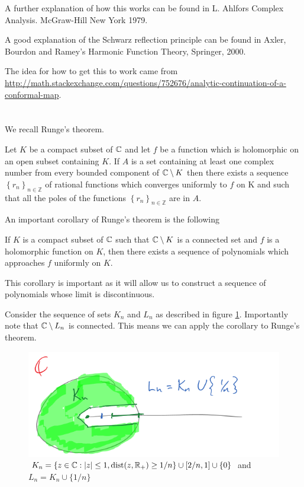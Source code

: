 \documentclass{unswmaths}
\begin{document}
A further explanation of how this works can be found in L. Ahlfors Complex Analysis. McGraw-Hill New York 1979.  

A good explanation of the Schwarz reflection principle can be found in Axler, Bourdon and Ramey's Harmonic Function Theory, Springer, 2000.

The idea for how to get this to work came from \url{http://math.stackexchange.com/questions/752676/analytic-continuation-of-a-conformal-map}.


\section{}
We recall Runge's theorem.
\begin{theorem}
Let $K $ be a compact subset of $ \mathbb{C} $ and let $ f $ be a function which is holomorphic on an open subset containing $ K $. If $ A $ is a set containing at least one complex number from every bounded component of $ \mathbb{C} \setminus K $ then there exists a sequence $ \left\{ r_n\right\}_{n \in \mathbb{Z}} $ of rational functions which converges uniformly to $ f $ on K and such that all the poles of the functions $ \left\{ r_n\right\}_{n \in \mathbb{Z}} $ are in $ A $.  
\end{theorem}

An important corollary of Runge's theorem is the following
\begin{corollary}
	If $ K $ is a compact subset of $ \mathbb{C} $ such that $ \mathbb{C} \setminus K $ is a connected set and $ f $ is a holomorphic function on $ K $, then there exists a sequence of polynomials which approaches $ f $ uniformly on $ K $.
\end{corollary}

This corollary is important as it will allow us to construct a sequence of polynomials whose limit is discontinuous. 

Consider the sequence of sets $ K_n $ and $ L_n $ as described in figure \ref{fig:1}. Importantly note that $ \mathbb{C} \setminus L_n $ is connected. This means we can apply the corollary to Runge's theorem.
\begin{figure}[h]
	\includegraphics[scale=1]{ComplexDomainTask2Qn2}
	\caption{$K_n = \{ z \in \mathbb{C} : |z| \leq 1, \operatorname{dist}(z, \mathbb{R}_+) \geq 1/n \} \cup [2 / n, 1] \cup \{0 \}$ and $ L_n = K_n \cup \{ 1 / n \} $}
		\label{fig:1}
\end{figure}
\end{document}
